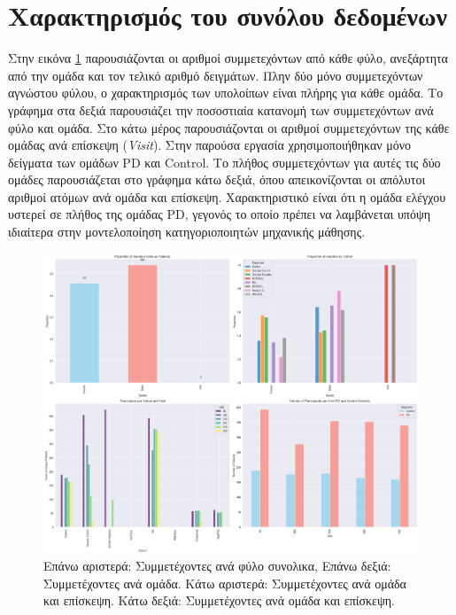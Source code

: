 \documentclass[12pt]{report}
\makeatletter
\let\oldchapter\chapter
\renewcommand{\chapter}{\@ifstar{\starchapter}{\nostarchapter}}
\newcommand{\starchapter}[1]{\oldchapter*{#1}\thispagestyle{mainstyle}}
\newcommand{\nostarchapter}[1]{\oldchapter{#1}\thispagestyle{mainstyle}}
\makeatother
\begin{document}
    \chapter{Ανάλυση των δεδομένων}
        \section{Χαρακτηρισμός του συνόλου δεδομένων}
        \par
            Στην εικόνα \ref{fig:ppmi-proportion-of-genders-absolute-and-per-cohort} παρουσιάζονται οι αριθμοί συμμετεχόντων από κάθε φύλο, ανεξάρτητα από την ομάδα και τον τελικό αριθμό δειγμάτων. Πλην δύο μόνο συμμετεχόντων αγνώστου φύλου, ο χαρακτηρισμός των υπολοίπων είναι πλήρης για κάθε ομάδα. Το γράφημα στα δεξιά παρουσιάζει την ποσοστιαία κατανομή των συμμετεχόντων ανά φύλο και ομάδα. Στο κάτω μέρος παρουσιάζονται οι αριθμοί συμμετεχόντων της κάθε ομάδας ανά επίσκεψη (\emph{Visit}). Στην παρούσα εργασία χρησιμοποιήθηκαν μόνο δείγματα των ομάδων PD  και Control. Το πλήθος συμμετεχόντων για αυτές τις δύο ομάδες παρουσιάζεται στο γράφημα κάτω δεξιά, όπου απεικονίζονται οι απόλυτοι αριθμοί ατόμων ανά ομάδα και επίσκεψη. Χαρακτηριστικό είναι ότι η ομάδα ελέγχου υστερεί σε πλήθος της ομάδας PD, γεγονός το οποίο πρέπει να λαμβάνεται υπόψη ιδιαίτερα στην μοντελοποίηση κατηγοριοποιητών μηχανικής μάθησης.
            \begin{figure}[h]
                \centering
                \includegraphics[width=0.73\linewidth]{Chapter-2-Section-2.1/ppmi-prop-gender-abs-per-cohort_samples-per-coh-visit-all-coh_pd-vs-ctrl.png}
                \caption[Πλήθος συμμετέχοντων ανά φύλο]{Επάνω αριστερά: Συμμετέχοντες ανά φύλο συνολικα, Επάνω δεξιά: Συμμετέχοντες ανά ομάδα. Κάτω αριστερά: Συμμετέχοντες ανά ομάδα και επίσκεψη. Κάτω δεξιά: Συμμετέχοντες ανά ομάδα και επίσκεψη.}
                \label{fig:ppmi-proportion-of-genders-absolute-and-per-cohort}
            \end{figure}
\end{document}
